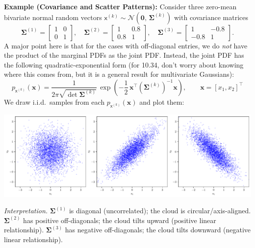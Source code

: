 \begin{exampleBox}
    \textbf{Example (Covariance and Scatter Patterns):}
    Consider three zero-mean bivariate normal random vectors
    \(
    \boldsymbol{\mathsf{x}}^{(k)}\sim \mathcal{N}(\mathbf{0},\,\mathbf{\Sigma}^{(k)})
    \)
    with covariance matrices
    \[
    \mathbf{\Sigma}^{(1)}=\begin{bmatrix}1&0\\0&1\end{bmatrix},\quad
    \mathbf{\Sigma}^{(2)}=\begin{bmatrix}1&0.8\\0.8&1\end{bmatrix},\quad
    \mathbf{\Sigma}^{(3)}=\begin{bmatrix}1&-0.8\\-0.8&1\end{bmatrix}.
    \]
    A major point here is that for the cases with off-diagonal entries, we do \emph{not} have the product of the marginal PDFs as the joint PDF. Instead, the joint PDF has the following quadratic-exponential form (for 10.34, don't worry about knowing where this comes from, but it is a general result for multivariate Gaussians):
    \begin{equation}
    p_{\boldsymbol{\mathsf{x}}^{(k)}}(\mathbf{x})
    = \frac{1}{2\pi\sqrt{\det\mathbf{\Sigma}^{(k)}}}\,
    \exp\!\left(
    -\frac{1}{2}\,\mathbf{x}^\top \left(\mathbf{\Sigma}^{(k)}\right)^{-1}\mathbf{x}
    \right),\qquad \mathbf{x}=[x_1,x_2]^\top
    \end{equation}
    We draw i.i.d.\ samples from each $p_{\boldsymbol{\mathsf{x}}^{(k)}}(\mathbf{x})$ and plot them:
    \begin{center}
      \includegraphics[width=\textwidth]{figs/probability/covariance_panels.pdf}
    \end{center}
    \textit{Interpretation.} 
    $\mathbf{\Sigma}^{(1)}$ is diagonal (uncorrelated); the cloud is circular/axis-aligned. 
    $\mathbf{\Sigma}^{(2)}$ has positive off-diagonals; the cloud tilts upward (positive linear relationship).
    $\mathbf{\Sigma}^{(3)}$ has negative off-diagonals; the cloud tilts downward (negative linear relationship).
\end{exampleBox}
    

